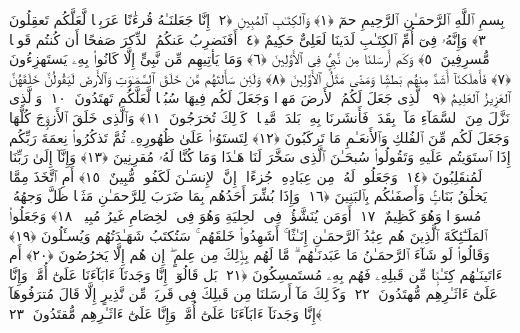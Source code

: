 
  
    
  
    
    

\nopagebreak
  بِسمِ ٱللَّهِ ٱلرَّحمَـٰنِ ٱلرَّحِيمِ
  حمٓ ﴿١﴾
 وَٱلكِتَـٰبِ ٱلمُبِينِ ﴿٢﴾
 إِنَّا جَعَلنَـٰهُ قُرءَٰنًا عَرَبِيًّۭا لَّعَلَّكُم تَعقِلُونَ ﴿٣﴾
 وَإِنَّهُۥ فِىٓ أُمِّ ٱلكِتَـٰبِ لَدَينَا لَعَلِىٌّ حَكِيمٌ ﴿٤﴾
 أَفَنَضرِبُ عَنكُمُ ٱلذِّكرَ صَفحًا أَن كُنتُم قَومًۭا مُّسرِفِينَ ﴿٥﴾
 وَكَم أَرسَلنَا مِن نَّبِىٍّۢ فِى ٱلأَوَّلِينَ ﴿٦﴾
 وَمَا يَأتِيهِم مِّن نَّبِىٍّ إِلَّا كَانُوا۟ بِهِۦ يَستَهزِءُونَ ﴿٧﴾
 فَأَهلَكنَآ أَشَدَّ مِنهُم بَطشًۭا وَمَضَىٰ مَثَلُ ٱلأَوَّلِينَ ﴿٨﴾
 وَلَئِن سَأَلتَهُم مَّن خَلَقَ ٱلسَّمَـٰوَٟتِ وَٱلأَرضَ لَيَقُولُنَّ خَلَقَهُنَّ ٱلعَزِيزُ ٱلعَلِيمُ ﴿٩﴾
 ٱلَّذِى جَعَلَ لَكُمُ ٱلأَرضَ مَهدًۭا وَجَعَلَ لَكُم فِيهَا سُبُلًۭا لَّعَلَّكُم تَهتَدُونَ ﴿١٠﴾
 وَٱلَّذِى نَزَّلَ مِنَ ٱلسَّمَآءِ مَآءًۢ بِقَدَرٍۢ فَأَنشَرنَا بِهِۦ بَلدَةًۭ مَّيتًۭا ۚ كَذَٟلِكَ تُخرَجُونَ ﴿١١﴾
 وَٱلَّذِى خَلَقَ ٱلأَزوَٟجَ كُلَّهَا وَجَعَلَ لَكُم مِّنَ ٱلفُلكِ وَٱلأَنعَـٰمِ مَا تَركَبُونَ ﴿١٢﴾
 لِتَستَوُۥا۟ عَلَىٰ ظُهُورِهِۦ ثُمَّ تَذكُرُوا۟ نِعمَةَ رَبِّكُم إِذَا ٱستَوَيتُم عَلَيهِ وَتَقُولُوا۟ سُبحَـٰنَ ٱلَّذِى سَخَّرَ لَنَا هَـٰذَا وَمَا كُنَّا لَهُۥ مُقرِنِينَ ﴿١٣﴾
 وَإِنَّآ إِلَىٰ رَبِّنَا لَمُنقَلِبُونَ ﴿١٤﴾
 وَجَعَلُوا۟ لَهُۥ مِن عِبَادِهِۦ جُزءًا ۚ إِنَّ ٱلإِنسَـٰنَ لَكَفُورٌۭ مُّبِينٌ ﴿١٥﴾
 أَمِ ٱتَّخَذَ مِمَّا يَخلُقُ بَنَاتٍۢ وَأَصفَىٰكُم بِٱلبَنِينَ ﴿١٦﴾
 وَإِذَا بُشِّرَ أَحَدُهُم بِمَا ضَرَبَ لِلرَّحمَـٰنِ مَثَلًۭا ظَلَّ وَجهُهُۥ مُسوَدًّۭا وَهُوَ كَظِيمٌ ﴿١٧﴾
 أَوَمَن يُنَشَّؤُا۟ فِى ٱلحِليَةِ وَهُوَ فِى ٱلخِصَامِ غَيرُ مُبِينٍۢ ﴿١٨﴾
 وَجَعَلُوا۟ ٱلمَلَـٰٓئِكَةَ ٱلَّذِينَ هُم عِبَٰدُ ٱلرَّحمَـٰنِ إِنَـٰثًا ۚ أَشَهِدُوا۟ خَلقَهُم ۚ سَتُكتَبُ شَهَـٰدَتُهُم وَيُسـَٔلُونَ ﴿١٩﴾
 وَقَالُوا۟ لَو شَآءَ ٱلرَّحمَـٰنُ مَا عَبَدنَـٰهُم ۗ مَّا لَهُم بِذَٟلِكَ مِن عِلمٍ ۖ إِن هُم إِلَّا يَخرُصُونَ ﴿٢٠﴾
 أَم ءَاتَينَـٰهُم كِتَـٰبًۭا مِّن قَبلِهِۦ فَهُم بِهِۦ مُستَمسِكُونَ ﴿٢١﴾
 بَل قَالُوٓا۟ إِنَّا وَجَدنَآ ءَابَآءَنَا عَلَىٰٓ أُمَّةٍۢ وَإِنَّا عَلَىٰٓ ءَاثَـٰرِهِم مُّهتَدُونَ ﴿٢٢﴾
 وَكَذَٟلِكَ مَآ أَرسَلنَا مِن قَبلِكَ فِى قَريَةٍۢ مِّن نَّذِيرٍ إِلَّا قَالَ مُترَفُوهَآ إِنَّا وَجَدنَآ ءَابَآءَنَا عَلَىٰٓ أُمَّةٍۢ وَإِنَّا عَلَىٰٓ ءَاثَـٰرِهِم مُّقتَدُونَ ﴿٢٣﴾
